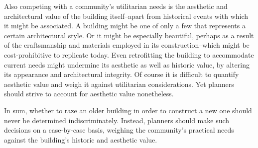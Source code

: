 Also competing with a community's utilitarian needs is the aesthetic and architectural value of the building itself--apart from historical events with which it might be associated.
A building might be one of only a few that represents a certain architectural style.
Or it might be especially beautiful, perhaps as a result of the craftsmanship and materials employed in its construction--which might be cost-prohibitive to replicate today.
Even retrofitting the building to accommodate current needs might undermine its aesthetic as well as historic value, by altering its appearance and architectural integrity.
Of course it is difficult to quantify aesthetic value and weigh it against utilitarian considerations.
Yet planners should strive to account for aesthetic value nonetheless.


In sum, whether to raze an older building in order to construct a new one should never be determined indiscriminately.
Instead, planners should make such decisions on a case-by-case basis, weighing the community's practical needs against the building's historic and aesthetic value.
